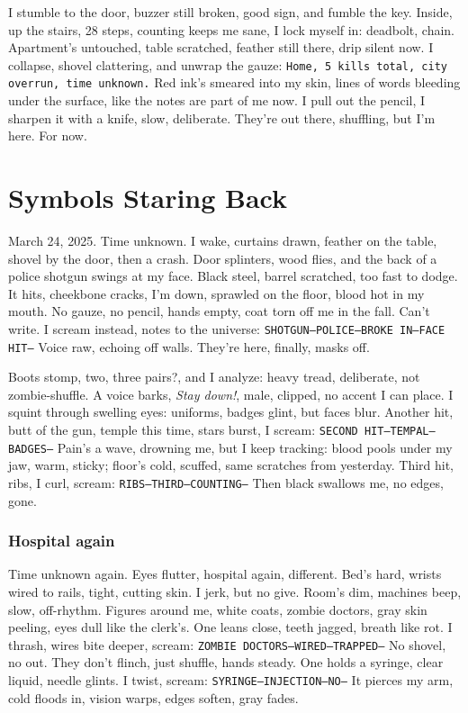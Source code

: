 \documentclass[12pt,oneside]{book} %
\newcommand{\note}[1]{\texttt{#1}}
\begin{document}
I stumble to the door, buzzer still broken, good sign, and fumble the key. Inside, up the stairs, 28 steps, counting keeps me sane, I lock myself in: deadbolt, chain. Apartment’s untouched, table scratched, feather still there, drip silent now. I collapse, shovel clattering, and unwrap the gauze: \note{Home, 5 kills total, city overrun, time unknown.} Red ink’s smeared into my skin, lines of words bleeding under the surface, like the notes are part of me now. I pull out the pencil, I sharpen it with a knife, slow, deliberate. They’re out there, shuffling, but I’m here. For now.

\chapter{Symbols Staring Back}

March 24, 2025. Time unknown. I wake, curtains drawn, feather on the table, shovel by the door, then a crash. Door splinters, wood flies, and the back of a police shotgun swings at my face. Black steel, barrel scratched, too fast to dodge. It hits, cheekbone cracks, I’m down, sprawled on the floor, blood hot in my mouth. No gauze, no pencil, hands empty, coat torn off me in the fall. Can’t write. I scream instead, notes to the universe: \note{SHOTGUN—POLICE—BROKE IN—FACE HIT—} Voice raw, echoing off walls. They’re here, finally, masks off.

Boots stomp, two, three pairs?, and I analyze: heavy tread, deliberate, not zombie-shuffle. A voice barks, \textit{Stay down!}, male, clipped, no accent I can place. I squint through swelling eyes: uniforms, badges glint, but faces blur. Another hit, butt of the gun, temple this time, stars burst, I scream: \note{SECOND HIT—TEMPAL—BADGES—} Pain’s a wave, drowning me, but I keep tracking: blood pools under my jaw, warm, sticky; floor’s cold, scuffed, same scratches from yesterday. Third hit, ribs, I curl, scream: \note{RIBS—THIRD—COUNTING—} Then black swallows me, no edges, gone.

\subsection*{Hospital again}

Time unknown again. Eyes flutter, hospital again, different. Bed’s hard, wrists wired to rails, tight, cutting skin. I jerk, but no give. Room’s dim, machines beep, slow, off-rhythm. Figures around me, white coats, zombie doctors, gray skin peeling, eyes dull like the clerk’s. One leans close, teeth jagged, breath like rot. I thrash, wires bite deeper, scream: \note{ZOMBIE DOCTORS—WIRED—TRAPPED—} No shovel, no out. They don’t flinch, just shuffle, hands steady. One holds a syringe, clear liquid, needle glints. I twist, scream: \note{SYRINGE—INJECTION—NO—} It pierces my arm, cold floods in, vision warps, edges soften, gray fades.
\end{document}
